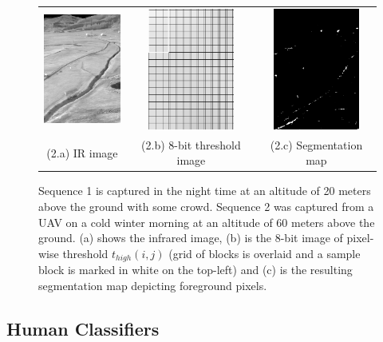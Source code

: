 \documentclass[runningheads]{llncs}
\begin{document}
\begin{figure}
  \begin{tabular}{ccc}
    \includegraphics[height=4cm]{img/bg_sub/Roth_Infrared_Image_screenshot.png} &
    \includegraphics[height=4cm]{img/bg_sub/Roth_Threshold_values(high)_screenshot.png} &
    \includegraphics[height=4cm]{img/bg_sub/Roth_Segmentation_Map_screenshot.png} \\
    \small (2.a) IR image & 
    \small (2.b) 8-bit threshold image &
    \small (2.c) Segmentation map
  \end{tabular}

  \caption{Sequence 1 is captured in the night time at an altitude of 20 meters above the ground with some crowd. Sequence 2 was captured from a UAV on a cold winter morning at an altitude of 60 meters above the ground. (a) shows the infrared image, (b) is the 8-bit image of pixel-wise threshold $t_{high}(i, j)$  (grid of blocks is overlaid and a sample block is marked in white on the top-left) and (c) is the resulting segmentation map depicting foreground pixels.}\label{fig:bg_sub}
\end{figure}


\subsection{Human Classifiers}
\end{document}
